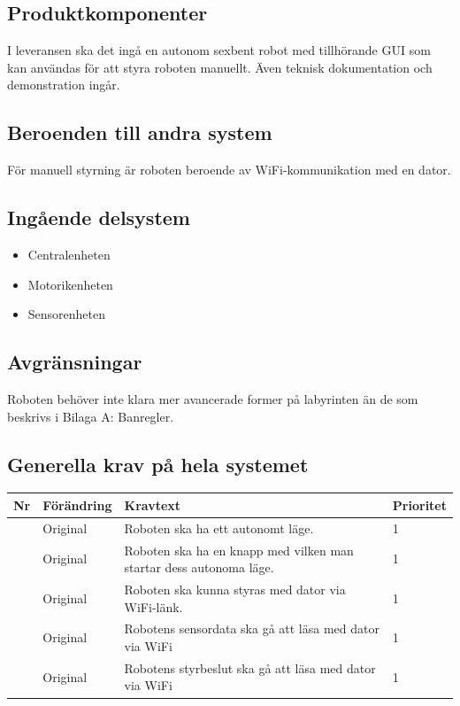 \documentclass[a4paper,titlepage,12pt]{article}
\newcounter{reqNr}
\newcommand{\nextReqNr}{\stepcounter{reqNr}\arabic{reqNr}}
\begin{document}
	\subsection{Produktkomponenter}
	I leveransen ska det ingå en autonom sexbent robot med tillhörande GUI som kan användas för att 
	styra roboten manuellt. Även teknisk dokumentation och demonstration ingår. 
	\subsection{Beroenden  till andra system}
    För manuell styrning är roboten beroende av WiFi-kommunikation med en dator.
	\subsection{Ingående delsystem}
    \begin{itemize}
	    De ingående delsystemen är:
        \item Centralenheten
        \item Motorikenheten
        \item Sensorenheten
    \end{itemize}
	\subsection{Avgränsningar}
	Roboten behöver inte klara mer avancerade former på labyrinten än de som beskrivs i Bilaga A: Banregler.
	\subsection{Generella krav på hela systemet}

	\begin{table}[h]
		\begin{tabularx}{\textwidth}{|c|l|X|l|}
		\hline
			\textbf{Nr} & \textbf{Förändring} & \textbf{Kravtext} & \textbf{Prioritet} 
				\\ \hline
	
			\nextReqNr & Original & Roboten ska ha ett autonomt läge. & 1
					\\ \hline

			\nextReqNr & Original & Roboten ska ha en knapp med vilken man startar 
				dess autonoma läge. & 1
				\\ \hline

			\nextReqNr & Original & Roboten ska kunna styras med dator 
				via WiFi-länk. & 1
				\\ \hline
		
			\nextReqNr & Original & Robotens sensordata ska gå att läsa 
				med dator via WiFi & 1
				\\ \hline

			\nextReqNr & Original & Robotens styrbeslut ska gå att läsa 
				med dator via WiFi & 1
				\\ \hline
		\end{tabularx}
	\end{table}
\end{document}
